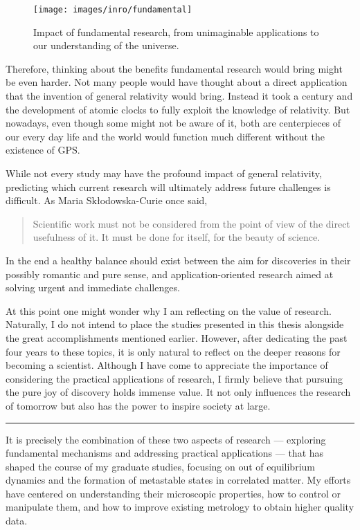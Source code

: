 \begin{figure}
	\centering
	\texttt{[image: images/inro/fundamental]}
	\caption{Impact of fundamental research, from unimaginable applications to our understanding of the universe.}
	\label{fig:fundamental}
\end{figure}


Therefore, thinking about the benefits fundamental research would bring might be even harder.
Not many people would have thought about a direct application that the invention of general relativity would bring.
Instead it took a century and the development of atomic clocks to fully exploit the knowledge of relativity.
But nowadays, even though some might not be aware of it, both are centerpieces of our every day life and the world would function much different without the existence of GPS.

While not every study may have the profound impact of general relativity, predicting which current research will ultimately address future challenges is difficult.
As Maria Skłodowska-Curie once said,
\begin{quote} 
	\centering 
	 Scientific work must not be considered from the point of view of the direct usefulness of it. It must be done for itself, for the beauty of science.
\end{quote}
In the end a healthy balance should exist between the aim for discoveries in their possibly romantic and pure sense, and application-oriented research aimed at solving urgent and immediate challenges.

At this point one might wonder why I am reflecting on the value of research.
Naturally, I do not intend to place the studies presented in this thesis alongside the great accomplishments mentioned earlier.
However, after dedicating the past four years to these topics, it is only natural to reflect on the deeper reasons for becoming a scientist.
Although I have come to appreciate the importance of considering the practical applications of research, I firmly believe that pursuing the pure joy of discovery holds immense value.
It not only influences the research of tomorrow but also has the power to inspire society at large.

\begin{center}
	\rule{0.3\textwidth}{.8pt}
\end{center}

It is precisely the combination of these two aspects of research — exploring fundamental mechanisms and addressing practical applications — that has shaped the course of my graduate studies, focusing on out of equilibrium dynamics and the formation of metastable states in correlated matter.
My efforts have centered on understanding their microscopic properties, how to control or manipulate them, and how to improve existing metrology to obtain higher quality data.

